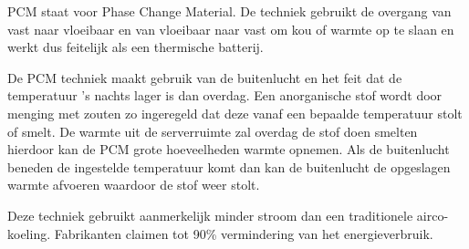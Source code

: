 PCM staat voor Phase Change Material. De techniek gebruikt de overgang van vast naar vloeibaar en van vloeibaar naar vast om kou of warmte op te slaan en werkt dus feitelijk als een thermische batterij.

De PCM techniek maakt gebruik van de buitenlucht en het feit dat de temperatuur 's nachts lager is dan overdag. Een anorganische stof wordt door menging met zouten zo ingeregeld dat deze vanaf een bepaalde temperatuur stolt of smelt. De warmte uit de serverruimte zal overdag de stof doen smelten hierdoor kan de PCM grote hoeveelheden warmte opnemen. Als de buitenlucht beneden de ingestelde temperatuur komt dan kan de buitenlucht de opgeslagen warmte afvoeren waardoor de stof weer stolt.

Deze techniek gebruikt aanmerkelijk minder stroom dan een traditionele airco-koeling. Fabrikanten claimen tot 90\% vermindering van het energieverbruik.
